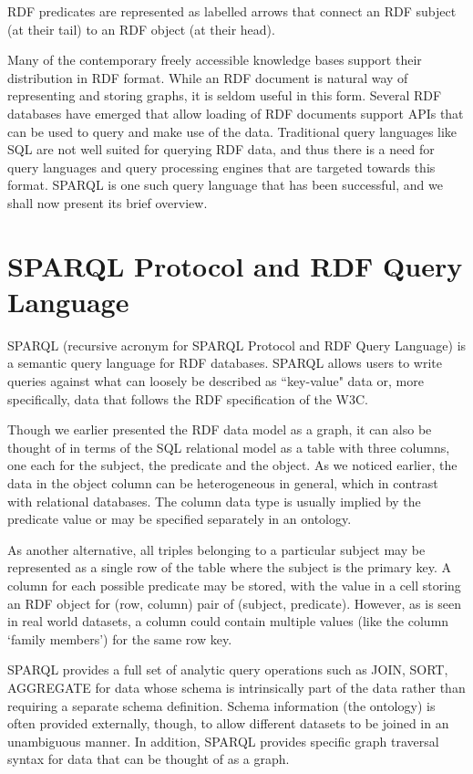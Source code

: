 \documentclass[a4paper, twoside, 12pt]{report}
\begin{document}
RDF predicates are represented as labelled arrows that connect an RDF subject (at their tail) to an RDF object (at their head).

Many of the contemporary freely accessible knowledge bases support their distribution in RDF format. While an RDF document is natural way of representing and storing graphs, it is seldom useful in this form. Several RDF databases have emerged that allow loading of RDF documents support APIs that can be used to query and make use of the data. Traditional query languages like SQL are not well suited for querying RDF data, and thus there is a need for query languages and query processing engines that are targeted towards this format. SPARQL is one such query language that has been successful, and we shall now present its brief overview.


\section[SPARQL]{SPARQL Protocol and RDF Query Language}

SPARQL\cite{prud2008sparql} (recursive acronym for SPARQL Protocol and RDF Query Language) is a semantic query language for RDF databases. SPARQL allows users to write queries against what can loosely be described as ``key-value" data or, more specifically, data that follows the RDF specification of the W3C.

Though we earlier presented the RDF data model as a graph, it can also be thought of in terms of the SQL relational model as a table with three columns, one each for the subject, the predicate and the object. As we noticed earlier, the data in the object column can be heterogeneous in general, which in contrast with relational databases. The column data type is usually implied by the predicate value or may be specified separately in an ontology.

As another alternative, all triples belonging to a particular subject may be represented as a single row of the table where the subject is the primary key. A column for each possible predicate may be stored, with the value in a cell storing an RDF object for (row, column) pair of (subject, predicate). However, as is seen in real world datasets, a column could contain multiple values (like the column `family members') for the same row key.

SPARQL provides a full set of analytic query operations such as JOIN, SORT, AGGREGATE for data whose schema is intrinsically part of the data rather than requiring a separate schema definition. Schema information (the ontology) is often provided externally, though, to allow different datasets to be joined in an unambiguous manner. In addition, SPARQL provides specific graph traversal syntax for data that can be thought of as a graph.
\end{document}
